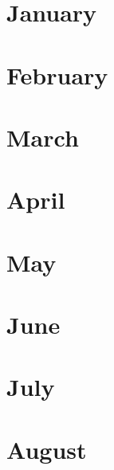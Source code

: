 \documentclass{article}
\begin{document}




\section{January}

\section{February}
\section{March}
\section{April}
\section{May}
\section{June}
\section{July}
\section{August}


\end{document}
